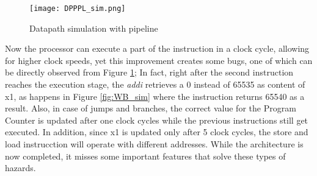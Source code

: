 \begin{figure}[!ht]
    \centering
    \texttt{[image: DPPPL\_sim.png]}
    \caption{Datapath simulation with pipeline}
    \label{fig:DPPPL_sim}
\end{figure}

Now the processor can execute a part of the instruction in a clock cycle, allowing for higher clock speeds, yet this improvement creates some bugs, one of which can be directly observed from Figure \ref{fig:DPPPL_sim}; In fact, right after the second instruction reaches the execution stage, the \emph{addi} retrieves a 0 instead of 65535 as content of x1, as happens in Figure \ref{fig:WB_sim} where the instruction returns 65540 as a result.
Also, in case of jumps and branches, the correct value for the Program Counter is updated after one clock cycles while the previous instructions still get executed. In addition, since x1 is updated only after 5 clock cycles, the store and load instrucction will operate with different addresses.
While the architecture is now completed, it misses some important features that solve these types of hazards.  